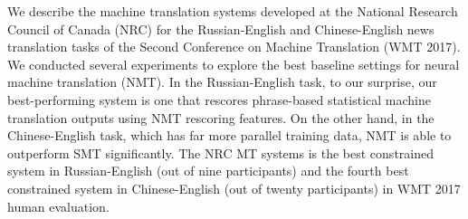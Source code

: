 We describe the machine translation systems developed at the National Research Council of Canada (NRC) for the Russian-English and Chinese-English news translation tasks of the Second Conference on Machine Translation (WMT 2017). We conducted several experiments to explore the best baseline settings for neural machine translation (NMT). In the Russian-English task, to our surprise, our best-performing system is one that rescores phrase-based statistical machine translation outputs using NMT rescoring features. On the other hand, in the Chinese-English task, which has far more parallel training data, NMT is able to outperform SMT significantly. The NRC MT systems is the best constrained system in Russian-English (out of nine participants) and the fourth best constrained system in Chinese-English (out of twenty participants) in WMT 2017 human evaluation.
